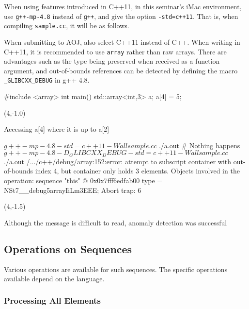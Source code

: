 When using features introduced in C++11, in this seminar's iMac environment, use \texttt{g++-mp-4.8} instead of \texttt{g++}, and give the option \texttt{-std=c++11}. That is, when compiling \texttt{sample.cc}, it will be as follows.
When submitting to AOJ, also select C++11 instead of C++.
When writing in C++11, it is recommended to use \texttt{array} rather than raw arrays. There are advantages such as the type being preserved when received as a function argument, and out-of-bounds references can be detected by defining the macro \texttt{\_GLIBCXX\_DEBUG} in g++ 4.8.
\begin{c11box}
#include <array>
int main() {
  std::array<int,3> a;
  a[4] = 5;
}  
\end{c11box}
\begin{textblock}{3.5}(4,-1.0)
\begin{shaded*}
\noindent Accessing a[4] where it is up to a[2]
\end{shaded*}
\end{textblock}
\begin{terminal}
$ g++-mp-4.8 -std=c++11 -Wall sample.cc
$ ./a.out
# Nothing happens
$ g++-mp-4.8 -D_GLIBCXX_DEBUG -std=c++11 -Wall sample.cc
$ ./a.out
/.../c++/debug/array:152:error: attempt to subscript container
    with out-of-bounds index 4, but container only holds 3    
    elements.
Objects involved in the operation:
sequence "this" @ 0x0x7fff6edfab00 {
  type = NSt7__debug5arrayIiLm3EEE;
}
Abort trap: 6  
\end{terminal}
\begin{textblock}{3.5}(4,-1.5)
\begin{shaded*}
\noindent Although the message is difficult to read, anomaly detection was successful
\end{shaded*}
\end{textblock}
\subsection{Operations on Sequences}
Various operations are available for such sequences. The specific operations available depend on the language.

\subsubsection{Processing All Elements}

